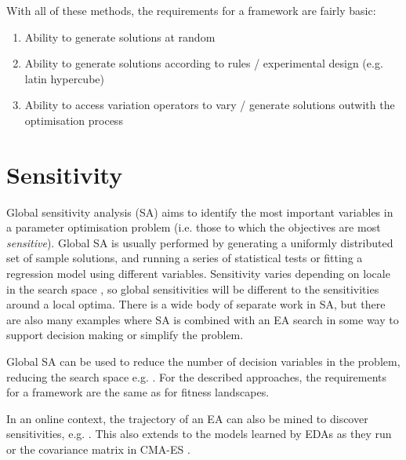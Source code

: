 \documentclass[a4paper]{article}
\begin{document}
With all of these methods, the requirements for a framework are fairly basic:
\begin{enumerate}
	\item Ability to generate solutions at random
	\item Ability to generate solutions according to rules / experimental design (e.g. latin hypercube)
	\item Ability to access variation operators to vary / generate solutions outwith the optimisation process
\end{enumerate}

\section{Sensitivity}

Global sensitivity analysis (SA) \cite{Saltelli2008} aims to identify the most important variables in a parameter optimisation problem (i.e. those to which the objectives are most \emph{sensitive}).
Global SA is usually performed by generating a uniformly distributed set of sample solutions, and running a series of statistical tests or fitting a regression model using different variables.
Sensitivity varies depending on locale in the search space \cite{Chabin2015}, so global sensitivities will be different to the sensitivities around a local optima.
There is a wide body of separate work in SA, but there are also many examples where SA is combined with an EA search in some way to support decision making or simplify the problem.

Global SA can be used to reduce the number of decision variables in the problem, reducing the search space e.g. \cite{Eisenhower2012a,Eisenhower2012,Fu2012}.
For the described approaches, the requirements for a framework are the same as for fitness landscapes.


In an online context, the trajectory of an EA can also be mined to discover sensitivities, e.g. \cite{Wright2012,Paula2011}.
This also extends to the models learned by EDAs as they run \cite{Brownlee2013,Hauschild2009,Santana2009,Yu2009,Santana2011} or the covariance matrix in CMA-ES \cite{Muller2007}.
\end{document}
